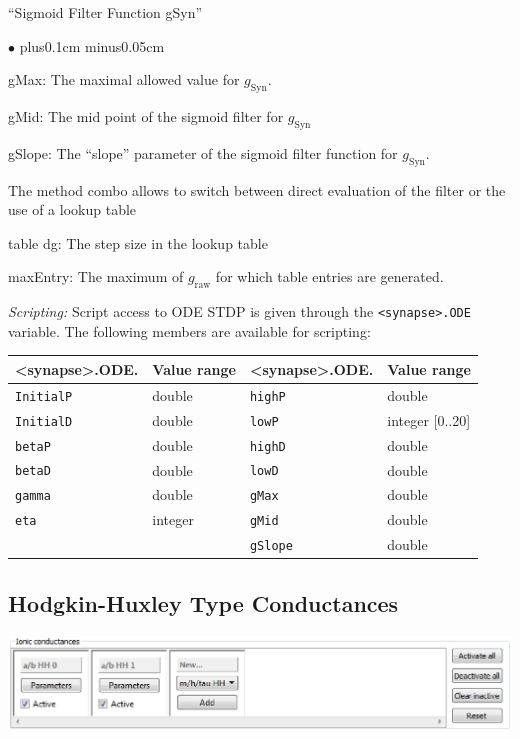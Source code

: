 \documentclass{article}
\newenvironment{myitem}{\begin{list}{$\bullet$}{\setlength{\leftmargin}{1.1em}
\itemsep0.1cm plus0.1cm minus0.05cm
\listparindent0cm
\addtolength{\labelsep}{0.5\labelsep}
\setlength{\labelwidth}{0.8em}
\setlength{\leftmargin}{\labelwidth}
\addtolength{\leftmargin}{\labelsep}
}}{\end{list}}
\begin{document}
``Sigmoid Filter Function gSyn''
\begin{myitem}
\item gMax: The maximal allowed value for $g_{\text{Syn}}$.
\item gMid: The mid point of the sigmoid filter for $g_{\text{Syn}}$
\item gSlope: The ``slope'' parameter of the sigmoid filter function
  for $g_{\text{Syn}}$.
\item The method combo allows to switch between direct evaluation of
  the filter or the use of a lookup table
\item table dg: The step size in the lookup table
\item maxEntry: The maximum of $g_{\text{raw}}$ for which table
  entries are generated.
\end{myitem}  

\noindent
\emph{Scripting:} Script access to ODE STDP is given through the \texttt{<synapse>.ODE} variable.
The following members are available for scripting: \\
\begin{tabular}[b]{|ll|ll|}
	\hline
	{\bf \textless{}synapse\textgreater.ODE.\textvisiblespace} & {\bf Value range} 
	& {\bf \textless{}synapse\textgreater.ODE.\textvisiblespace} & {\bf Value range} \\
	\hline
	\texttt{InitialP} & double 	& \texttt{highP} & double \\
	\texttt{InitialD} & double 	& \texttt{lowP} & integer [0..20] \\
	\texttt{betaP} & double 	& \texttt{highD} & double \\
	\texttt{betaD} & double 	& \texttt{lowD} & double \\
	\texttt{gamma} & double 	& \texttt{gMax} & double \\
	\texttt{eta} & integer 		& \texttt{gMid} & double \\
					 &  		& \texttt{gSlope} & double \\
	\hline
\end{tabular}


\subsection{Hodgkin-Huxley Type Conductances} \label{HHcurrents}

\parbox{\textwidth}{
  \includegraphics[scale=0.5]{HHBlock}
} \\[0.2cm]
\end{document}
